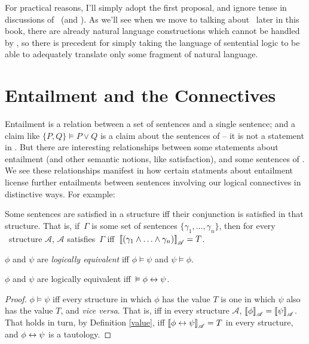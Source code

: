 \begin{itemize}
\end{itemize} For practical reasons, I'll simply adopt the first proposal, and ignore tense in discussions of \lone\ (and \ltwo). As we'll see when we move to talking about \ltwo\ later in this book, there are already natural language constructions which cannot be handled by \lone, so there is precedent for simply taking the language of sentential logic to be able to adequately translate only some fragment of natural language. 





 \section{Entailment and the Connectives}

Entailment is a relation between a set of sentences and a single sentence; and a claim like $\{P, Q\} \vDash P \vee Q$ is a claim about the sentences of \lone – it is not a statement in \lone. But there are interesting relationships between some statements about entailment (and other semantic notions, like satisfaction), and some sentences of \lone. We see these relationships manifest in how certain statments about entailment license further entailments between sentences involving our logical connectives in distinctive ways. For example:
\begin{theorem} Some sentences are satisfied in a structure iff their conjunction is satisfied in that structure. That is, if\, $\Gamma$ is some set of sentences $\{\gamma_{1},\ldots,\gamma_{n}\}$, then for every \lone\ structure $\mathscr{A}$, $\mathscr{A}$ satisfies\, $\Gamma$ iff\, $\left\llbracket (\gamma_{1}\wedge\ldots\wedge\gamma_{n})\right\rrbracket_{\mathscr{A}}=T$.\label{cone}
\end{theorem}

\begin{definition}[Equivalence]
	$\phi$ and $\psi$ are \emph{logically equivalent} iff $\phi \vDash \psi$ and $\psi\vDash\phi$.
\end{definition}
\begin{theorem}	
		$\phi$ and $\psi$ are logically equivalent iff\, $\vDash \phi \leftrightarrow \psi$.
		\begin{proof}
		$\phi\vDash\psi$ iff every structure in which $\phi$ has the value $T$ is one in which $\psi$ also has the value $T$, and \emph{vice versa}. That is, iff in every structure $\mathscr{A}$, $\left\llbracket \phi\right\rrbracket_{\mathscr{A}}=\left\llbracket \psi\right\rrbracket_{\mathscr{A}}$. That holds in turn, by Definition \ref{value}, iff $\left\llbracket \phi\leftrightarrow\psi\right\rrbracket_{\mathscr{A}}=T$ in every structure, and $\phi\leftrightarrow\psi$ is a tautology.
		\end{proof}
	\end{theorem}		

